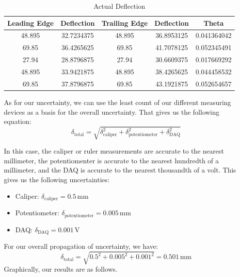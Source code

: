 \documentclass{article}
\begin{document}
\begin{table}[hbtp]
  \centering
  \begin{tabular}{ccccc}
  \hline
  Leading Edge & Deflection & Trailing Edge & Deflection & Theta \\
  \hline
  48.895 & 32.7234375 & 48.895 & 36.8953125 & 0.041364042 \\
  69.85 & 36.4265625 & 69.85 & 41.7078125 & 0.052345491 \\
  27.94 & 28.8796875 & 27.94 & 30.6609375 & 0.017669292 \\
  48.895 & 33.9421875 & 48.895 & 38.4265625 & 0.044458532 \\
  69.85 & 37.8796875 & 69.85 & 43.1921875 & 0.052654657 \\
  \hline
  \end{tabular}
  \caption{Actual Deflection}
  \label{table:actual_deflection}
  \end{table}
  
As for our uncertainty, we can use the least count of our different measuring devices as a basis for the overall uncertainty. That gives us the following equation:
\[
\delta_{\text{total}} = \sqrt{\delta_{\text{caliper}}^2 + \delta_{\text{potentiometer}}^2 + \delta_{\text{DAQ}}^2}
\]

In this case, the caliper or ruler measurements are accurate to the nearest millimeter, the potentiomenter is accurate to the nearest hundredth of a millimeter, and the DAQ is accurate to the nearest thousandth of a volt. This gives us the following uncertainties: 
\begin{itemize}
  \item Caliper: \(\delta_{\text{caliper}} = 0.5\, \text{mm}\)
  \item Potentiometer: \(\delta_{\text{potentiometer}} = 0.005\, \text{mm}\)
  \item DAQ: \(\delta_{\text{DAQ}} = 0.001\, \text{V}\)
\end{itemize}

For our overall propagation of uncertainty, we have:
\[
\delta_{\text{total}} = \sqrt{0.5^2 + 0.005^2 + 0.001^2} = 0.501\, \text{mm}
\]
Graphically, our results are as follows.
\end{document}
